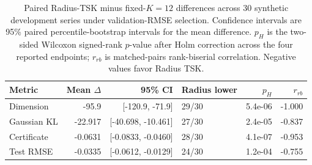 \begin{table}[htbp]
\centering
\caption{Paired Radius-TSK minus fixed-$K=12$ differences across 30 synthetic development series under validation-RMSE selection. Confidence intervals are 95\% paired percentile-bootstrap intervals for the mean difference. $p_H$ is the two-sided Wilcoxon signed-rank $p$-value after Holm correction across the four reported endpoints; $r_{rb}$ is matched-pairs rank-biserial correlation. Negative values favor Radius TSK.}
\label{tab:structural_inference}
\small
\setlength{\tabcolsep}{4pt}
\begin{tabular}{lrrlrr}
\toprule
Metric & Mean $\Delta$ & 95\% CI & Radius lower & $p_H$ & $r_{rb}$ \\
\midrule
Dimension & -95.9 & [-120.9, -71.9] & 29/30 & 5.4e-06 & -1.000 \\
Gaussian KL & -22.917 & [-40.698, -10.461] & 27/30 & 2.4e-05 & -0.837 \\
Certificate & -0.0631 & [-0.0833, -0.0460] & 28/30 & 4.1e-07 & -0.953 \\
Test RMSE & -0.0335 & [-0.0612, -0.0129] & 24/30 & 1.2e-04 & -0.755 \\
\bottomrule
\end{tabular}
\end{table}
